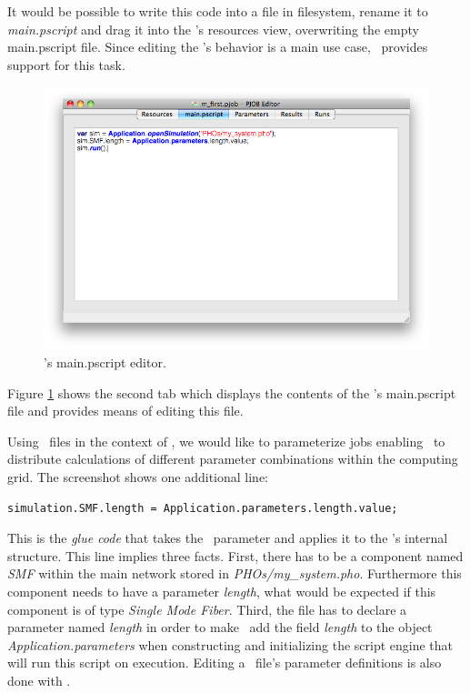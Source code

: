 It would be possible to write this code into a file in filesystem, rename it to \textit{main.pscript}
and drag it into the \PJOB's resources view, overwriting the empty main.pscript file.
Since editing the \PJOB's behavior is a main use case,
\pjobeditor\ provides support for this task.
\begin{figure}[h!]
\includegraphics[width=\textwidth]{Screenshots/PJobEditor/main_pscript.png}
\caption{\pjobeditor's main.pscript editor.}
\label{editor:main_pscript}
\end{figure}
Figure \ref{editor:main_pscript} shows the second tab which displays the contents of the \PJOB's main.pscript file
and provides means of editing this file.\bb

Using \PJOB\ files in the context of \PQUEUE,
we would like to parameterize jobs
enabling \PQUEUE\ to distribute calculations of different parameter combinations within the computing grid.
The screenshot shows one additional line:
\begin{lstlisting}
simulation.SMF.length = Application.parameters.length.value;
\end{lstlisting}
This is the \textit{glue code} that takes the \PJOB\ parameter and applies it to the \PJOB's internal structure.
This line implies three facts.
First, there has to be a component named \textit{SMF} within the main network stored in \textit{PHOs/my\_system.pho}.
Furthermore this component needs to have a parameter \textit{length},
what would be expected if this component is of type \textit{Single Mode Fiber}.
Third, the \PJOB file has to declare a parameter named \textit{length}
in order to make \PHO\ add the field \textit{length} to the object \textit{Application.parameters}
when constructing and initializing the script engine that will run this script on execution.
Editing a \PJOB\ file's parameter definitions is also done with \pjobeditor.




